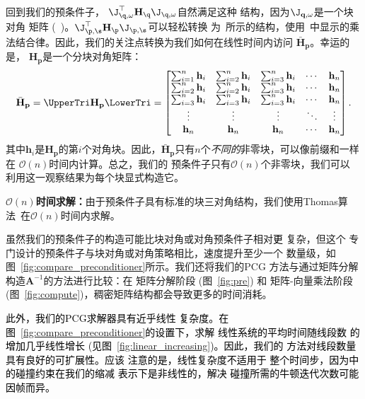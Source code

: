 回到我们的预条件子，
$\J_{\q,\omega}^\top \mathbf{H}_\q \J_{\q, \omega}$自然满足这种
结构，因为$\J_{\mathbf{q, \omega}}$是一个块对角
矩阵 (~)。$\J_{\p,\s}^\top \mathbf{H}_\p \J_{\p, \s}$可以轻松转换
为~所示的结构，使用~中显示的乘法结合律。因此，我们的关注点转换为我们如何在线性时间内访问
$\bar{\mathbf{H}}_{\mathbf{p}}$。幸运的是，
$\mathbf{H}_{\mathbf{p}}$是一个分块对角矩阵：
\begin{equation}
  \bar{\mathbf{H}}_{\mathbf{p}} = \UpperTri \mathbf{H}_{\mathbf{p}} \LowerTri =
  \begin{bmatrix}
    \sum_{i=1}^{n} \mathbf{h}_{i} & \sum_{i=2}^{n} \mathbf{h}_{i} & \sum_{i=3}^{n} \mathbf{h}_{i} & \cdots & \mathbf{h}_{n} \\
    \sum_{i=2}^{n} \mathbf{h}_{i} & \sum_{i=2}^{n} \mathbf{h}_{i} & \sum_{i=3}^{n} \mathbf{h}_{i} & \cdots & \mathbf{h}_{n} \\
    \sum_{i=3}^{n} \mathbf{h}_{i} & \sum_{i=3}^{n} \mathbf{h}_{i} & \sum_{i=3}^{n} \mathbf{h}_{i} & \cdots & \mathbf{h}_{n} \\
    \vdots                        & \vdots                        & \vdots                        & \ddots & \vdots         \\
    \mathbf{h}_{n}                & \mathbf{h}_{n}                & \mathbf{h}_{n}                & \cdots & \mathbf{h}_{n} \\
  \end{bmatrix}.
\end{equation}
其中$\mathbf{h}_{i}$是$\mathbf{H}_{\mathbf{p}}$的第$i$个对角块。因此，$\bar{\mathbf{H}}_{\mathbf{p}}$只有$n$个\emph{不同的}非零块，可以像前缀和一样在
$\mathcal{O}(n)$时间内计算。总之，我们的
预条件子只有$\mathcal{O}(n)$个非零块，我们可以
利用这一观察结果为每个块显式构造它。

\textbf{$\mathcal{O}(n)$时间求解：}由于预条件子具有标准的块三对角结构，我们使用Thomas算法~\cite{thomas1949elliptic}在$\mathcal{O}(n)$时间内求解。

虽然我们的预条件子的构造可能比块对角或对角预条件子相对\textcolor{black}{更}
复杂，但这个
专门设计的预条件子与块对角或对角策略相比，速度提升至少一个
数量级，如图~\ref{fig:compare_preconditioner}所示。我们还将我们的PCG
方法与通过矩阵分解构造$\mathbf A^{-1}$的方法进行比较：在
矩阵分解阶段 (图~\ref{fig:pre}) 和
矩阵-向量乘法阶段 (图~\ref{fig:compute})，稠密矩阵结构都会导致更多的时间消耗。

\textcolor{black}{此外，我们的PCG求解器具有近乎线性
  复杂度。在
  图~\ref{fig:compare_preconditioner}的设置下，求解
  线性系统的平均时间随线段数
  的增加几乎线性增长 (见图~\ref{fig:linear_increasing})。因此，我们的
  方法对线段数量具有良好的可扩展性。应该
  注意的是，线性复杂度不适用于
  整个时间步，因为中的碰撞约束在我们的缩减
  表示下是非线性的，解决
  碰撞所需的牛顿迭代次数可能因帧而异。}

